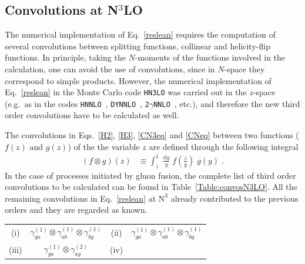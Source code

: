 \documentclass[12pt]{article}
\DeclareRobustCommand{\rd}{\ensuremath{\mathrm{d}}}
\DeclareRobustCommand{\LO}{\text{LO}\xspace}
\DeclareRobustCommand{\N}[1]{\ensuremath{\text{N}^{#1}}} %
\begin{document}
\begin{appendix}
\section{Convolutions at \texorpdfstring{N${}^\text{3}$LO}{N3LO}}
\label{app:Convos}

The numerical implementation of Eq.~\eqref{reslean} requires the computation of several convolutions between splitting functions, collinear and helicity-flip functions. In principle, taking the $N$-moments of the functions involved in the calculation, one can avoid the use of convolutions, since in $N$-space they correspond to simple products. However, the numerical implementation of Eq.~\eqref{reslean} in the Monte Carlo code \texttt{HN3LO} was carried out in the $z$-space (e.g.\ as in the codes \texttt{HNNLO}~\cite{Catani:2007vq}, \texttt{DYNNLO}~\cite{Catani:2009sm}, \texttt{2$\gamma$NNLO}~\cite{Catani:2011qz}, etc.), and therefore the new third order convolutions have to be calculated as well. 

The convolutions in Eqs.~\eqref{H2}, \eqref{H3}, \eqref{CN3eq} and \eqref{CNeq} between two functions ($f(z)$ and $g(z)$) of the the variable $z$ are defined through the following integral
\begin{align}
  \left( f \otimes g \right)(z) &\equiv \int^{1}_{z} \; \frac{\rd y}{y} \; f\left(\frac{z}{y}\right) \; g(y) \;.
\end{align}
In the case of processes initiated by gluon fusion, the complete list of third order convolutions to be calculated can be found in Table~\ref{Table:convosN3LO}. All the remaining convolutions in Eq.~\eqref{reslean} at \N3\LO already  contributed to the previous orders and they are regarded as known.

\begin{table}
\centering
\renewcommand{\arraystretch}{1.5}
\begin{tabular}{ |c|c||c|c| }
\hline
\multirow{1}{*}{(i)} 

& $\gamma^{(1)}_{ga}\otimes\gamma^{(1)}_{a b}\otimes\gamma^{(1)}_{bg}$

& \multirow{1}{*}{(ii)} 

& $\gamma^{(1)}_{ga}\otimes\gamma^{(1)}_{ab}\otimes\gamma^{(1)}_{bq}$  \\


\multirow{1}{*}{(iii)} 

& $\gamma^{(1)}_{ga}\otimes\gamma^{(2)}_{ag}$

& \multirow{1}{*}{(iv)} 


\end{tabular}
\end{table}
\end{appendix}
\end{document}
